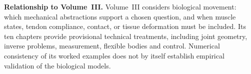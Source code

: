 \documentclass[10pt, openany]{book}
\theoremstyle{plain}
\begin{document}
\textbf{Relationship to Volume~III.} Volume~III considers biological movement:
which mechanical abstractions support a chosen question, and when muscle
states, tendon compliance, contact, or tissue deformation must be included.
Its ten chapters provide provisional technical treatments, including joint
geometry, inverse problems, measurement, flexible bodies and control.
Numerical consistency of its worked examples does not
by itself establish empirical validation of the biological models.

\cleardoublepage

\tableofcontents

\cleardoublepage












\backmatter




\printindex
\end{document}
